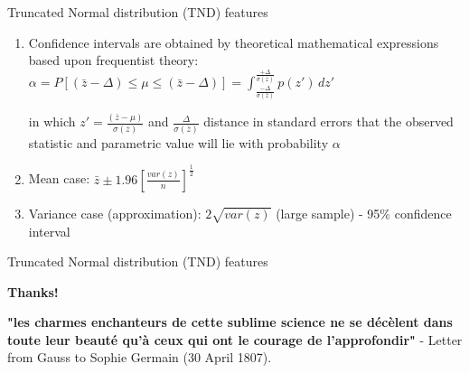 \documentclass{beamer}
\begin{document}

\begin{frame}{Truncated Normal distribution (TND) features}
  \begin{enumerate}
  
  \item<1-> Confidence intervals are obtained by theoretical mathematical expressions based upon frequentist theory:
  \vspace{0.2cm}
  $\alpha = P\left[\left(\bar{z} - \Delta \right) \leq \mu \leq \left(\bar{z} - \Delta \right)\right] = \int_{\frac{-\Delta}{\sigma(\bar{z})}}^{\frac{+\Delta}{\sigma(\bar{z})}} p(z')\, dz'$

  in which $z'=\frac{(\bar{z}-\mu)}{\sigma(\bar{z})}$ and $\frac{\Delta}{\sigma(\bar{z})}$ distance in standard errors that the observed statistic and parametric value will lie with probability $\alpha$   
   
  \vspace{0.2cm} 
  
  \item<2-> Mean case: $\bar{z} \pm 1.96 \left[ \frac{var(z)}{n} \right]^{\frac{1}{2}}$
  \vspace{0.2cm}
  
  \item<3-> Variance case (approximation): $2\sqrt{var(z)}$ (large sample) - 95\% confidence interval 
  \vspace{0.2cm}
             
  \end{enumerate}
    
\end{frame}


\begin{frame}{Truncated Normal distribution (TND) features}
  
  \centerline{\textbf{Thanks!}}
  
  \vspace{1cm}
  
  \textbf{"les charmes enchanteurs de cette sublime science ne se décèlent dans toute leur beauté qu'à ceux qui ont le courage de l'approfondir"} - Letter from Gauss to Sophie Germain (30 April 1807).
    
\end{frame}
\end{document}
